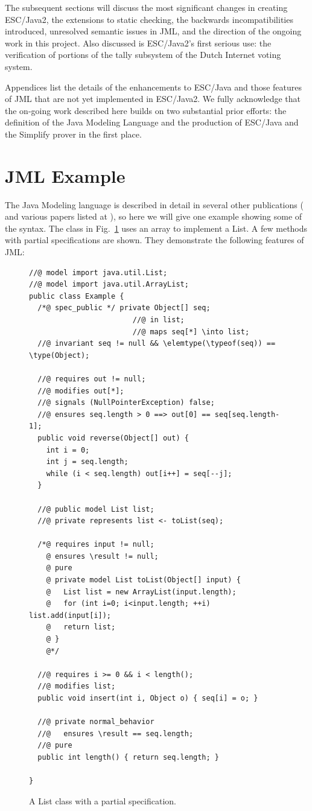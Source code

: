\documentclass{llncs}
\begin{document}
The subsequent sections will discuss the most significant changes in creating
ESC/Java2, the extensions to static checking, the backwards
incompatibilities introduced, unresolved semantic issues in JML, and
the direction of the ongoing work in this project.  Also discussed is
ESC/Java2's first serious use: the verification of portions of the
tally subsystem of the Dutch Internet voting system.

Appendices list the details of the enhancements to ESC/Java and those
features of JML that are not yet implemented in ESC/Java2.  We fully
acknowledge that the on-going work described here builds on two
substantial prior efforts: the definition of the Java Modeling Language and
the production of ESC/Java and the Simplify prover in the first place.

\section{JML Example}
The Java Modeling language is described in detail in several other publications
(\cite{Leavens-etal00} and various papers listed at \cite{jmlpapers}), so here we will give one example showing some of the syntax.  The class in Fig.~\ref{fig:example}
uses an array to implement a List.  A few methods with partial specifications are shown.
They demonstrate the following features of JML:
%
\begin{figure}[htbp]
\begin{verbatim}
//@ model import java.util.List;
//@ model import java.util.ArrayList;
public class Example {
  /*@ spec_public */ private Object[] seq;
                        //@ in list;
                        //@ maps seq[*] \into list;
  //@ invariant seq != null && \elemtype(\typeof(seq)) == \type(Object);

  //@ requires out != null;
  //@ modifies out[*];
  //@ signals (NullPointerException) false;
  //@ ensures seq.length > 0 ==> out[0] == seq[seq.length-1];
  public void reverse(Object[] out) {
    int i = 0;
    int j = seq.length;
    while (i < seq.length) out[i++] = seq[--j];
  }

  //@ public model List list;
  //@ private represents list <- toList(seq);

  /*@ requires input != null;
    @ ensures \result != null;
    @ pure
    @ private model List toList(Object[] input) {
    @   List list = new ArrayList(input.length);
    @   for (int i=0; i<input.length; ++i) list.add(input[i]);
    @   return list;
    @ }
    @*/

  //@ requires i >= 0 && i < length();
  //@ modifies list;
  public void insert(int i, Object o) { seq[i] = o; }

  //@ private normal_behavior
  //@   ensures \result == seq.length;
  //@ pure
  public int length() { return seq.length; }

}
\end{verbatim}
\caption{A List class with a partial specification.}
\label{fig:example}
\end{figure}
\end{document}
